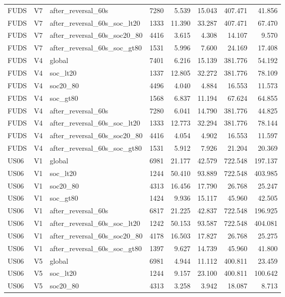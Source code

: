 \begin{tabular}{lllrrrrr}
FUDS & V7 & after\_reversal\_60s & 7280 & 5.539 & 15.043 & 407.471 & 41.856 \\
FUDS & V7 & after\_reversal\_60s\_soc\_lt20 & 1333 & 11.390 & 33.287 & 407.471 & 67.470 \\
FUDS & V7 & after\_reversal\_60s\_soc20\_80 & 4416 & 3.615 & 4.308 & 14.107 & 9.570 \\
FUDS & V7 & after\_reversal\_60s\_soc\_gt80 & 1531 & 5.996 & 7.600 & 24.169 & 17.408 \\
FUDS & V4 & global & 7401 & 6.216 & 15.139 & 381.776 & 54.192 \\
FUDS & V4 & soc\_lt20 & 1337 & 12.805 & 32.272 & 381.776 & 78.109 \\
FUDS & V4 & soc20\_80 & 4496 & 4.040 & 4.884 & 16.553 & 11.573 \\
FUDS & V4 & soc\_gt80 & 1568 & 6.837 & 11.194 & 67.624 & 64.855 \\
FUDS & V4 & after\_reversal\_60s & 7280 & 6.041 & 14.790 & 381.776 & 44.825 \\
FUDS & V4 & after\_reversal\_60s\_soc\_lt20 & 1333 & 12.773 & 32.294 & 381.776 & 78.144 \\
FUDS & V4 & after\_reversal\_60s\_soc20\_80 & 4416 & 4.054 & 4.902 & 16.553 & 11.597 \\
FUDS & V4 & after\_reversal\_60s\_soc\_gt80 & 1531 & 5.912 & 7.926 & 21.204 & 20.369 \\
US06 & V1 & global & 6981 & 21.177 & 42.579 & 722.548 & 197.137 \\
US06 & V1 & soc\_lt20 & 1244 & 50.410 & 93.889 & 722.548 & 403.985 \\
US06 & V1 & soc20\_80 & 4313 & 16.456 & 17.790 & 26.768 & 25.247 \\
US06 & V1 & soc\_gt80 & 1424 & 9.936 & 15.117 & 45.960 & 42.505 \\
US06 & V1 & after\_reversal\_60s & 6817 & 21.225 & 42.837 & 722.548 & 196.925 \\
US06 & V1 & after\_reversal\_60s\_soc\_lt20 & 1242 & 50.153 & 93.587 & 722.548 & 404.081 \\
US06 & V1 & after\_reversal\_60s\_soc20\_80 & 4178 & 16.503 & 17.827 & 26.768 & 25.275 \\
US06 & V1 & after\_reversal\_60s\_soc\_gt80 & 1397 & 9.627 & 14.739 & 45.960 & 41.800 \\
US06 & V5 & global & 6981 & 4.944 & 11.112 & 400.811 & 23.459 \\
US06 & V5 & soc\_lt20 & 1244 & 9.157 & 23.100 & 400.811 & 100.642 \\
US06 & V5 & soc20\_80 & 4313 & 3.258 & 3.942 & 18.087 & 8.713 \\

\end{tabular}
